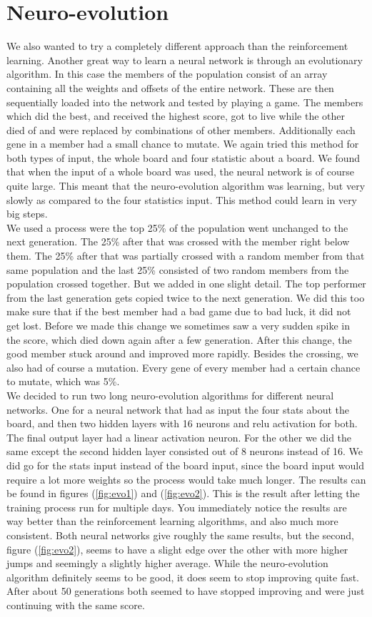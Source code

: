 \documentclass{report}
\begin{document}
\section{Neuro-evolution}
We also wanted to try a completely different approach than the reinforcement learning. Another great way to learn a neural network is through an evolutionary algorithm. In this case the members of the population consist of an array containing all the weights and offsets of the entire network. These are then sequentially loaded into the network and tested by playing a game. The members which did the best, and received the highest score, got to live while the other died of and were replaced by combinations of other members. Additionally each gene in a member had a small chance to mutate. We again tried this method for both types of input, the whole board and four statistic about a board. We found that when the input of a whole board was used, the neural network is of course quite large. This meant that the neuro-evolution algorithm was learning, but very slowly as compared to the four statistics input. This method could learn in very big steps.\\
We used a process were the top 25\% of the population went unchanged to the next generation. The 25\% after that was crossed with the member right below them. The 25\% after that was partially crossed with a random member from that same population and the last 25\% consisted of two random members from the population crossed together. But we added in one slight detail. The top performer from the last generation gets copied twice to the next generation. We did this too make sure that if the best member had a bad game due to bad luck, it did not get lost. Before we made this change we sometimes saw a very sudden spike in the score, which died down again after a few generation. After this change, the good member stuck around and improved more rapidly. Besides the crossing, we also had of course a mutation. Every gene of every member had a certain chance to mutate, which was 5\%.\\
We decided to run two long neuro-evolution algorithms for different neural networks. One for a neural network that had as input the four stats about the board, and then two hidden layers with 16 neurons and relu activation for both. The final output layer had a linear activation neuron. For the other we did the same except the second hidden layer consisted out of 8 neurons instead of 16. We did go for the stats input instead of the board input, since the board input would require a lot more weights so the process would take much longer. The results can be found in figures (\ref{fig:evo1}) and (\ref{fig:evo2}). This is the result after letting the training process run for multiple days. You immediately notice the results are way better than the reinforcement learning algorithms, and also much more consistent. Both neural networks give roughly the same results, but the second, figure (\ref{fig:evo2}), seems to have a slight edge over the other with more higher jumps and seemingly a slightly higher average. While the neuro-evolution algorithm definitely seems to be good, it does seem to stop improving quite fast. After about 50 generations both seemed to have stopped improving and were just continuing with the same score.\\
\end{document}
